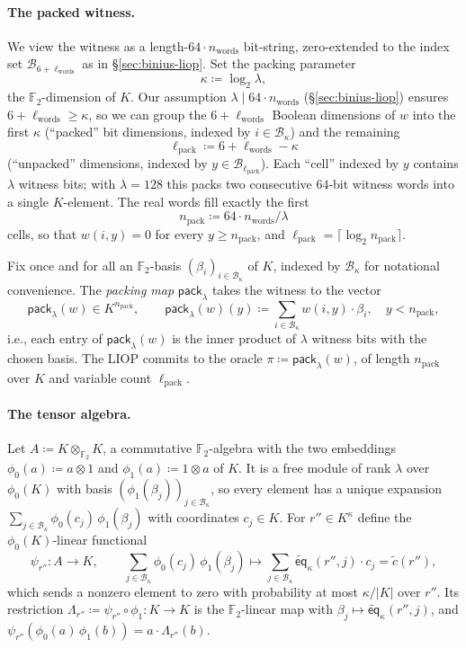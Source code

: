 \documentclass{article}
\theoremstyle{definition}
\newcommand*{\mle}{\widetilde}
\newcommand{\eq}{\mathsf{eq}}
\newcommand{\BB}{\mathcal{B}}
\newcommand{\FF}[1]{\mathbb{F}_{#1}}
\begin{document}
\paragraph{The packed witness.}
We view the witness as a length-$64 \cdot n_\text{words}$ bit-string, zero-extended to the index set $\BB_{6 + \ell_\text{words}}$ as in \S\ref{sec:binius-liop}. Set the packing parameter
\[
  \kappa \coloneqq \log_2 \lambda,
\]
the $\FF{2}$-dimension of $K$. Our assumption $\lambda \mid 64 \cdot n_\text{words}$ (\S\ref{sec:binius-liop}) ensures $6 + \ell_\text{words} \geq \kappa$, so we can group the $6 + \ell_\text{words}$ Boolean dimensions of $w$ into the first $\kappa$ (``packed'' bit dimensions, indexed by $i \in \BB_\kappa$) and the remaining
\[
  \ell_\text{pack} \coloneqq 6 + \ell_\text{words} - \kappa
\]
(``unpacked'' dimensions, indexed by $y \in \BB_{\ell_\text{pack}}$). Each ``cell'' indexed by $y$ contains $\lambda$ witness bits; with $\lambda = 128$ this packs two consecutive $64$-bit witness words into a single $K$-element. The real words fill exactly the first
\[
  n_\text{pack} \coloneqq 64 \cdot n_\text{words} / \lambda
\]
cells, so that $w(i, y) = 0$ for every $y \ge n_\text{pack}$, and $\ell_\text{pack} = \lceil \log_2 n_\text{pack} \rceil$.

Fix once and for all an $\FF{2}$-basis $(\beta_i)_{i \in \BB_\kappa}$ of $K$, indexed by $\BB_\kappa$ for notational convenience. The \emph{packing map} $\textsf{pack}_\lambda$ takes the witness to the vector
\[
  \textsf{pack}_\lambda(w) \in K^{n_\text{pack}}, \qquad \textsf{pack}_\lambda(w)(y) \coloneqq \sum_{i \in \BB_\kappa} w(i, y) \cdot \beta_i, \quad y < n_\text{pack},
\]
i.e., each entry of $\textsf{pack}_\lambda(w)$ is the inner product of $\lambda$ witness bits with the chosen basis. The LIOP commits to the oracle $\pi \coloneqq \textsf{pack}_\lambda(w)$, of length $n_\text{pack}$ over $K$ and variable count $\ell_\text{pack}$.

\paragraph{The tensor algebra.}
Let $A \coloneqq K \otimes_{\FF{2}} K$, a commutative $\FF{2}$-algebra with the two embeddings $\phi_0(a) \coloneqq a \otimes 1$ and $\phi_1(a) \coloneqq 1 \otimes a$ of $K$. It is a free module of rank $\lambda$ over $\phi_0(K)$ with basis $(\phi_1(\beta_j))_{j \in \BB_\kappa}$, so every element has a unique expansion $\sum_{j \in \BB_\kappa} \phi_0(c_j)\, \phi_1(\beta_j)$ with coordinates $c_j \in K$. For $r'' \in K^\kappa$ define the $\phi_0(K)$-linear functional
\[
  \psi_{r''} \colon A \to K, \qquad \sum_{j \in \BB_\kappa} \phi_0(c_j)\, \phi_1(\beta_j) \mapsto \sum_{j \in \BB_\kappa} \mle{\eq}_\kappa(r'', j) \cdot c_j = \mle{c}(r''),
\]
which sends a nonzero element to zero with probability at most $\kappa / |K|$ over $r''$. Its restriction $\Lambda_{r''} \coloneqq \psi_{r''} \circ \phi_1 \colon K \to K$ is the $\FF{2}$-linear map with $\beta_j \mapsto \mle{\eq}_\kappa(r'', j)$, and $\psi_{r''}(\phi_0(a)\, \phi_1(b)) = a \cdot \Lambda_{r''}(b)$.
\end{document}
